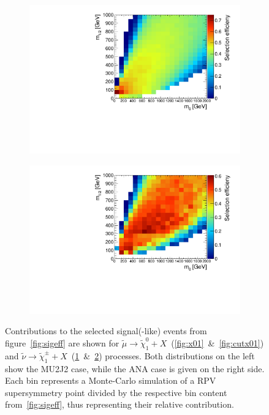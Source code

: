 \begin{figure}[ht!]
  \begin{subfigure}[b]{0.495\textwidth}
    \centering
    \includegraphics[width=\textwidth]{plots/hXplus1NeutRatio.pdf}
    \caption{\label{fig:xplus1neut}}
  \end{subfigure}
  \begin{subfigure}[b]{0.495\textwidth}
    \centering
    \includegraphics[width=\textwidth]{plots/hCutXplus1NeutRatio.pdf}
    \caption{\label{fig:cutxplus1neut}}
  \end{subfigure}
  \caption{Contributions to the selected signal(-like) events from figure~\ref{fig:sigeff} are shown for $\tilde{\mu} \rightarrow \tilde{\chi}^0_1 + X$~(\ref{fig:x01}~\&~\ref{fig:cutx01}) and $\tilde{\nu} \rightarrow \tilde{\chi}^\pm_1 + X$~(\ref{fig:xplus1neut}~\&~\ref{fig:cutxplus1neut}) processes. Both distributions on the left show the MU2J2 case, while the ANA case is given on the right side. Each bin represents a Monte-Carlo simulation of a RPV supersymmetry point divided by the respective bin content from~\ref{fig:sigeff}, thus representing their relative contribution.}
  \label{fig:x01sneuxplusratio}
\end{figure}

